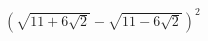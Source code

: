 \begin{ex}[type=expression]
	\begin{condition}
		\( (\sqrt{11+6\sqrt{2}}-\sqrt{11-6\sqrt{2}})^2 \)
	\end{condition}
\end{ex}